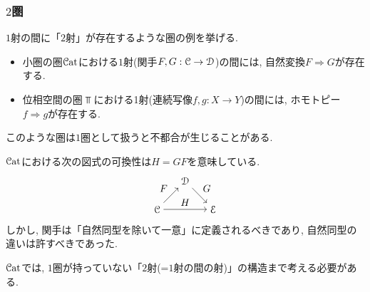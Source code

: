 \documentclass[aspectratio=169, dvipdfmx, 8pt, notheorems, uplatex]{beamer}
\begin{document}
\begin{frame}
\end{frame}

\begin{frame}
  \frametitle{$2$圏}

  $1$射の間に「$2$射」が存在するような圏の例を挙げる. 

  \begin{example}
    \begin{itemize}
      \item 小圏の圏$\mathcal{C}\mathrm{at}$における$1$射(関手$F,G : \mathcal{C} \to \mathcal{D}$)の間には, 自然変換$F \Rightarrow G$が存在する. 
      \item 位相空間の圏$\Top$における1射(連続写像$f,g : X \to Y$)の間には, ホモトピー$f \Rightarrow g$が存在する. 
    \end{itemize}
  \end{example}

  このような圏は$1$圏として扱うと不都合が生じることがある. 

  \begin{remark}
    $\mathcal{C}\mathrm{at}$における次の図式の可換性は$H=GF$を意味している.
    \[
    \begin{tikzpicture}[auto,->]
      \node (0) at (0,0) {$\C$};
      \node (1) at (1,1) {$\D$};
      \node (2) at (2,0) {$\E$};
      \draw (0) -- node {$F$} (1);
      \draw (1) -- node {$G$} (2);
      \draw (0) -- node {$H$} (2);
    \end{tikzpicture}
    \]
    しかし, 関手は「自然同型を除いて一意」に定義されるべきであり, 自然同型の違いは許すべきであった. 
  \end{remark}

  $\mathcal{C}\mathrm{at}$では, $1$圏が持っていない「$2$射(=$1$射の間の射)」の構造まで考える必要がある. 

\end{frame}
\end{document}
